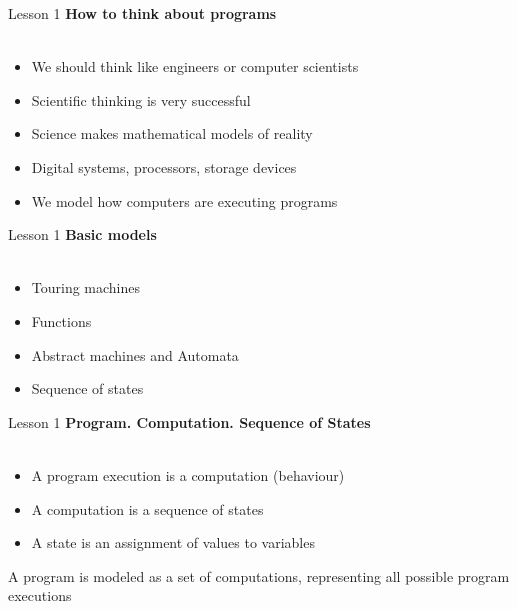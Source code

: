 \documentclass[aspectratio=1610]{beamer}
\begin{document}
\begin{frame}{Lesson 1}{}
\Large
\textbf{How to think about programs}\\~\\

\Large{
\begin{itemize}
    \item We should think like engineers or computer scientists
    \item Scientific thinking is very successful
    \item Science makes mathematical models of reality
	\item Digital systems, processors, storage devices
    \item We model how computers are executing programs
\end{itemize}}

\end{frame}



\begin{frame}{Lesson 1}{}
\Large
\textbf{Basic models}\\~\\

\Large{
\begin{itemize}
    \item Touring machines 
    \item Functions
    \item Abstract machines and Automata
    \item Sequence of states
\end{itemize}}

\end{frame}




\begin{frame}{Lesson 1}{}
\Large
\textbf{Program. Computation. Sequence of States}\\~\\

\Large{
\begin{itemize}
    \item A program execution is a computation (behaviour)
    \item A computation is a sequence of states    
    \item A state is an assignment of values to variables
\end{itemize}}

\Large {A program is modeled as a set of computations, representing all possible program executions}
\end{frame}
\end{document}
